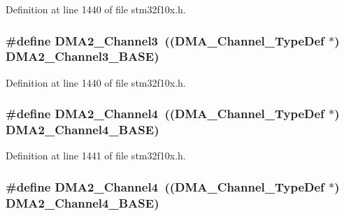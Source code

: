 Definition at line 1440 of file stm32f10x.\+h.

\subsubsection[{\texorpdfstring{D\+M\+A2\+\_\+\+Channel3}{DMA2_Channel3}}]{\setlength{\rightskip}{0pt plus 5cm}\#define D\+M\+A2\+\_\+\+Channel3~(({\bf D\+M\+A\+\_\+\+Channel\+\_\+\+Type\+Def} $\ast$) {\bf D\+M\+A2\+\_\+\+Channel3\+\_\+\+B\+A\+SE})}\hypertarget{group___peripheral__declaration_ga6dca52a79587e0ca9a5d669048b4c7eb}{}\label{group___peripheral__declaration_ga6dca52a79587e0ca9a5d669048b4c7eb}


Definition at line 1440 of file stm32f10x.\+h.

\subsubsection[{\texorpdfstring{D\+M\+A2\+\_\+\+Channel4}{DMA2_Channel4}}]{\setlength{\rightskip}{0pt plus 5cm}\#define D\+M\+A2\+\_\+\+Channel4~(({\bf D\+M\+A\+\_\+\+Channel\+\_\+\+Type\+Def} $\ast$) {\bf D\+M\+A2\+\_\+\+Channel4\+\_\+\+B\+A\+SE})}\hypertarget{group___peripheral__declaration_ga612b396657695191ad740b0b59bc9f12}{}\label{group___peripheral__declaration_ga612b396657695191ad740b0b59bc9f12}


Definition at line 1441 of file stm32f10x.\+h.

\subsubsection[{\texorpdfstring{D\+M\+A2\+\_\+\+Channel4}{DMA2_Channel4}}]{\setlength{\rightskip}{0pt plus 5cm}\#define D\+M\+A2\+\_\+\+Channel4~(({\bf D\+M\+A\+\_\+\+Channel\+\_\+\+Type\+Def} $\ast$) {\bf D\+M\+A2\+\_\+\+Channel4\+\_\+\+B\+A\+SE})}\hypertarget{group___peripheral__declaration_ga612b396657695191ad740b0b59bc9f12}{}\label{group___peripheral__declaration_ga612b396657695191ad740b0b59bc9f12}


